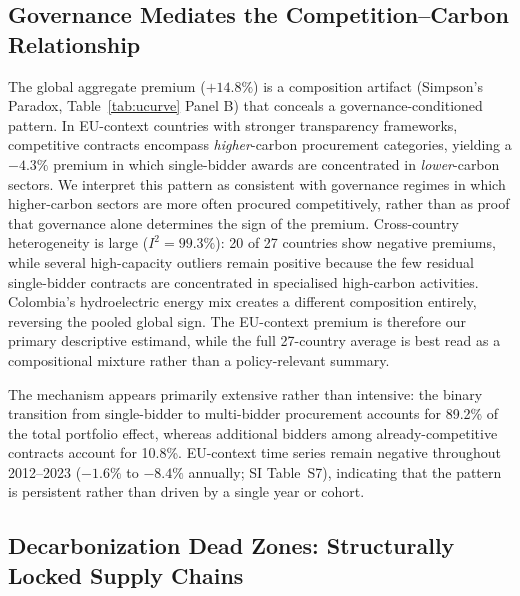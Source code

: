 \documentclass[11pt,a4paper]{article}
\begin{document}
\subsection{Governance Mediates the Competition--Carbon Relationship}

The global aggregate premium ($+14.8\%$) is a composition artifact (Simpson's Paradox, Table~\ref{tab:ucurve} Panel B) that conceals a governance-conditioned pattern. In EU-context countries with stronger transparency frameworks, competitive contracts encompass \textit{higher}-carbon procurement categories, yielding a $-4.3\%$ premium in which single-bidder awards are concentrated in \textit{lower}-carbon sectors. We interpret this pattern as consistent with governance regimes in which higher-carbon sectors are more often procured competitively, rather than as proof that governance alone determines the sign of the premium. Cross-country heterogeneity is large ($I^2 = 99.3\%$): 20 of 27 countries show negative premiums, while several high-capacity outliers remain positive because the few residual single-bidder contracts are concentrated in specialised high-carbon activities. Colombia's hydroelectric energy mix creates a different composition entirely, reversing the pooled global sign. The EU-context premium is therefore our primary descriptive estimand, while the full 27-country average is best read as a compositional mixture rather than a policy-relevant summary.

The mechanism appears primarily extensive rather than intensive: the binary transition from single-bidder to multi-bidder procurement accounts for 89.2\% of the total portfolio effect, whereas additional bidders among already-competitive contracts account for 10.8\%. EU-context time series remain negative throughout 2012--2023 ($-1.6\%$ to $-8.4\%$ annually; SI Table~S7), indicating that the pattern is persistent rather than driven by a single year or cohort.

\subsection{Decarbonization Dead Zones: Structurally Locked Supply Chains}
\end{document}
